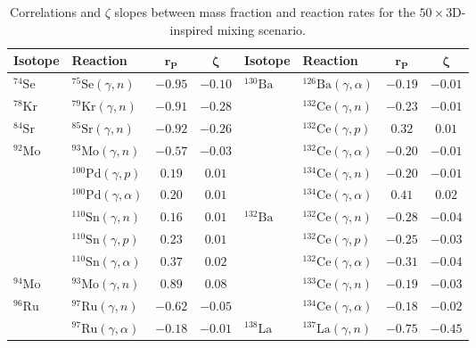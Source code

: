 \begin{table}
\caption{Correlations and $\zeta$ slopes between mass fraction and reaction rates for the $50\times$3D-inspired mixing scenario.
\label{tab:50x3d_corr}}
\scriptsize
    \begin{tabular}{llcc|llcc}
    \toprule
    \textbf{Isotope} & \textbf{Reaction} & $\mathbf{r_\mathrm{\mathbf{P}}}$ & $\mathbf{\zeta}$ & \textbf{Isotope} & \textbf{Reaction} & $\mathbf{r_\mathrm{\mathbf{P}}}$ & $\mathbf{\zeta}$ \\
    \toprule
    $^{74}\mathrm{Se}$ & $^{75}\mathrm{Se}(\gamma,n)$ & $-0.95$ & $-0.10$ & $^{130}\mathrm{Ba}$ & $^{126}\mathrm{Ba}(\gamma,\alpha)$ & $-0.19$ & $-0.01$ \\ 
    $^{78}\mathrm{Kr}$ & $^{79}\mathrm{Kr}(\gamma,n)$ & $-0.91$ & $-0.28$ & $ $ & $^{132}\mathrm{Ce}(\gamma,n)$ & $-0.23$ & $-0.01$ \\ 
    $^{84}\mathrm{Sr}$ & $^{85}\mathrm{Sr}(\gamma,n)$ & $-0.92$ & $-0.26$ & $ $ & $^{132}\mathrm{Ce}(\gamma,p)$ & $0.32$ & $0.01$ \\ 
    $^{92}\mathrm{Mo}$ & $^{93}\mathrm{Mo}(\gamma,n)$ & $-0.57$ & $-0.03$ & $ $ & $^{132}\mathrm{Ce}(\gamma,\alpha)$ & $-0.20$ & $-0.01$ \\ 
    $ $ & $^{100}\mathrm{Pd}(\gamma,p)$ & $0.19$ & $0.01$ & $ $ & $^{134}\mathrm{Ce}(\gamma,n)$ & $-0.20$ & $-0.01$ \\ 
    $ $ & $^{100}\mathrm{Pd}(\gamma,\alpha)$ & $0.20$ & $0.01$ & $ $ & $^{134}\mathrm{Ce}(\gamma,\alpha)$ & $0.41$ & $0.02$ \\ 
    $ $ & $^{110}\mathrm{Sn}(\gamma,n)$ & $0.16$ & $0.01$ & $^{132}\mathrm{Ba}$ & $^{132}\mathrm{Ce}(\gamma,n)$ & $-0.28$ & $-0.04$ \\ 
    $ $ & $^{110}\mathrm{Sn}(\gamma,p)$ & $0.23$ & $0.01$ & $ $ & $^{132}\mathrm{Ce}(\gamma,p)$ & $-0.25$ & $-0.03$ \\ 
    $ $ & $^{110}\mathrm{Sn}(\gamma,\alpha)$ & $0.37$ & $0.02$ & $ $ & $^{132}\mathrm{Ce}(\gamma,\alpha)$ & $-0.31$ & $-0.04$ \\ 
    $^{94}\mathrm{Mo}$ & $^{93}\mathrm{Mo}(\gamma,n)$ & $0.89$ & $0.08$ & $ $ & $^{133}\mathrm{Ce}(\gamma,n)$ & $-0.19$ & $-0.03$ \\ 
    $^{96}\mathrm{Ru}$ & $^{97}\mathrm{Ru}(\gamma,n)$ & $-0.62$ & $-0.05$ & $ $ & $^{134}\mathrm{Ce}(\gamma,\alpha)$ & $-0.18$ & $-0.02$ \\ 
    $ $ & $^{97}\mathrm{Ru}(\gamma,\alpha)$ & $-0.18$ & $-0.01$ & $^{138}\mathrm{La}$ & $^{137}\mathrm{La}(\gamma,n)$ & $-0.75$ & $-0.45$ \\ 

\end{tabular}
\end{table}
